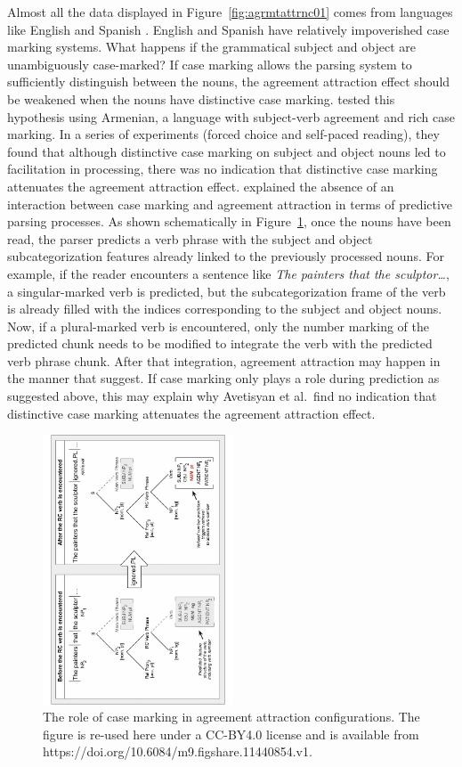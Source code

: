 \documentclass{cambridge7A}\usepackage[]{graphicx}\usepackage[]{color}
\begin{document}
Almost all the data displayed in Figure~\ref{fig:agrmtattrnc01} comes from languages like English and Spanish \citep[an exception is][who investigated Arabic]{TuckerIdrissiAlmeida2015}. English and Spanish have relatively impoverished case marking systems. What happens if the grammatical subject and object are unambiguously case-marked? If case marking allows the parsing system to sufficiently distinguish between the nouns, the agreement attraction effect should be weakened when the nouns have distinctive  case marking. \cite{ALV2020} tested this hypothesis using  Armenian, a language with subject-verb agreement and rich case marking. In a series of experiments (forced choice and self-paced reading), they found that although distinctive case marking on subject and object nouns led to facilitation in processing, there was no indication that distinctive case marking  attenuates the  agreement attraction effect. \cite{ALV2020} explained the absence of an interaction between case marking and agreement attraction in terms of predictive parsing processes. As shown schematically in Figure~\ref{fig:serinecase}, once the nouns have been read, the parser predicts a verb phrase with the subject and object  subcategorization features already linked to the previously processed nouns. For example, if the reader encounters a sentence like \textit{The painters that the sculptor\dots}, a singular-marked verb is predicted, but the subcategorization frame of the  verb is already filled with the  indices corresponding to the subject and object nouns. Now, if a plural-marked verb is encountered, only the number marking of the predicted chunk needs to be modified to integrate the verb with the predicted verb phrase chunk. After that integration, agreement attraction may happen in the manner that \cite{WagersLauPhillips2009} suggest. If case marking only plays a role during prediction as suggested above, 
this may explain why Avetisyan et al.\ find no indication that distinctive case marking attenuates the agreement attraction effect.  

\begin{figure}[!htbp]
\centering
\includegraphics[height=8cm,angle=-90]{figures/serine}
\caption{The role of case marking in agreement attraction configurations. The figure is re-used here under a CC-BY4.0 license and is available from https://doi.org/10.6084/m9.figshare.11440854.v1.}\label{fig:serinecase}
\end{figure} 
\end{document}
